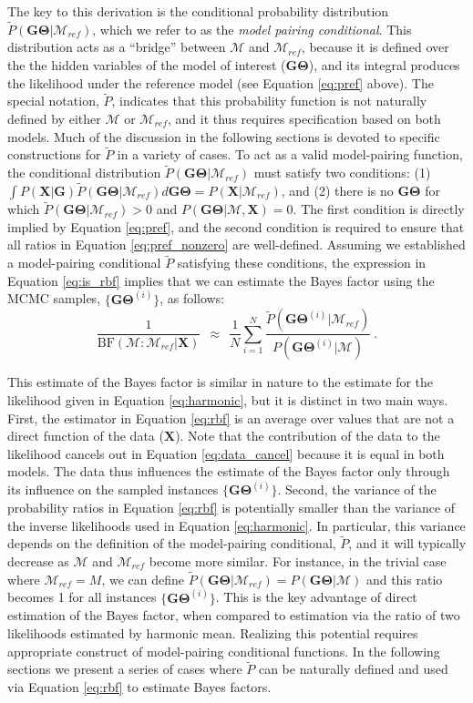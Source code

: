 \documentclass[11pt]{article}
\newcommand{\vect}[1]{\boldsymbol{\mathbf{#1}}}
\newcommand{\X}{\vect{X}}
\newcommand{\M}{\mathcal{M}}
\newcommand{\G}{\vect{G}}
\newcommand{\T}{\vect{\Theta}}
\newcommand{\GT}{\G\T}
\newcommand{\Mref}{\M_{ref}}
\newcommand{\Pref}{\widetilde{P}}
\newcommand{\rbf}{\text{BF}}
\begin{document}
The key to this derivation is the conditional probability distribution $\Pref(\GT|\Mref)$,
which we refer to as the {\em model pairing conditional}.
%
This distribution acts as a ``bridge'' between $\M$ and $\Mref$, because it is defined over the the hidden variables of
the model of interest ($\GT$), and its integral produces the likelihood under the reference model
(see Equation \ref{eq:pref} above).
%
The special notation, $\Pref$, indicates that this probability function is not naturally defined by either
$\M$ or $\Mref$, and it thus requires specification based on both models.
%
Much of the discussion in the following sections is devoted to specific constructions for $\Pref$ in a variety of cases.
%
To act as a valid model-pairing function, the conditional distribution $\Pref(\GT|\Mref)$ must satisfy two conditions:
%
(1) $\int P(\X|\G) \Pref(\GT|\Mref)d\GT=P(\X|\Mref)$, and
(2) there is no $\GT$ for which $\Pref(\GT|\Mref)>0$ and $P(\GT|\M,\X)=0$.
%
The first condition is directly implied by Equation \ref{eq:pref}, and the second condition is required to
ensure that all ratios in Equation \ref{eq:pref_nonzero} are well-defined.
%
Assuming we established a model-pairing conditional $\Pref$ satisfying these conditions, the expression in
Equation \ref{eq:is_rbf} implies that we can estimate the Bayes factor using the MCMC samples, $\{\GT^{(i)}\}$, as follows:
%
%
\begin{equation}\label{eq:rbf}
 \frac{1}{\rbf(\M:\Mref|\X)}  ~~\approx~~ \frac{1}{N} \sum_{i=1}^{N}\frac{\Pref(\GT^{(i)}|\Mref) }{P(\GT^{(i)}|\M)} ~.
\end{equation}
%
%

This estimate of the Bayes factor is similar in nature to the estimate for the likelihood given in Equation \ref{eq:harmonic},
but it is
distinct in two main ways. First, the estimator in Equation \ref{eq:rbf} is an average over values that are
not a direct function of the data ($\X$). Note that the contribution of the data to the likelihood cancels out
in Equation \ref{eq:data_cancel} because it is equal in both models. 
The data thus influences the estimate of the Bayes factor only through its influence on the sampled instances $\{\GT^{(i)}\}$.
%
Second, the variance of the probability ratios in Equation \ref{eq:rbf} is potentially smaller than the variance of the
inverse likelihoods used in Equation \ref{eq:harmonic}.
%
In particular, this variance depends on the definition of the model-pairing conditional, $\Pref$, and it will
typically decrease as $\M$ and $\Mref$ become more similar.
For instance, in the trivial case where $\Mref=M$, we can define $\Pref(\GT|\Mref)=P(\GT|\M)$ and this ratio becomes
1 for all instances $\{\GT^{(i)}\}$.
%
This is the key advantage of direct estimation of the Bayes factor, when compared to
estimation via the ratio of two likelihoods estimated by harmonic mean.
%
Realizing this potential requires appropriate construct of model-pairing conditional functions.
%
In the following sections we present a series of cases where $\Pref$ can be naturally defined and used via Equation \ref{eq:rbf}
to estimate Bayes factors.
\end{document}
